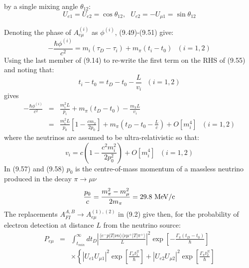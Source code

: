 \documentclass [12pt]{article}
\begin{document}
{  by a single mixing angle $\theta_{12}$:
    \begin{equation}
   U_{e1} = U_{e2} = \cos \theta_{12},~~~ U_{e2} = -U_{\mu 1} = \sin  \theta_{12}
    \end{equation}
  \par Denoting the phase of  $A_{e\mu}^{(i)}$ as $\phi^{(i)}$, (9.49)-(9.51) give:
    \begin{equation}
   -\frac{\hbar \phi^{(i)}}{c^2} =  m_i (\tau_D-\tau_i)+ m_{\pi}(t_i-t_0)~~~(i=1, 2) 
   \end{equation}                         
   Using the last member of (9.14) to re-write the first term on the RHS of (9.55) and noting that:
    \begin{equation}  
    t_i - t_0 = t_D-t_0-\frac{L}{v_i}~~~(i=1, 2)
    \end{equation}
    gives
     \begin{eqnarray}
   -\frac{\hbar \phi^{(i)}}{c^2} & = & \frac{m_i^2 L}{p_i}+ m_{\pi}(t_D-t_0) -\frac{ m_{\pi} L}{v_i}
      \nonumber \\
       & = & \frac{m_i^2 L}{p_0}\left[1-\frac{c m_{\pi}}{2 p_0}\right]+ m_{\pi}(t_D-t_0-\frac{L}{c})
     + O[m_i^4]~~~(i=1, 2) 
   \end{eqnarray}
     where the neutrinos are assumed to be ultra-relativistic so that:
       \begin{equation} 
    v_i = c\left(1-\frac{c^2 m_i^2}{2 p_0^2} \right) + O[m_i^4]~~~(i=1, 2)
    \end{equation}
   In (9.57) and (9.58) $p_0$ is the centre-of-mass momentum of a massless neutrino produced
   in the decay $ \pi \rightarrow \mu \nu$
    \begin{equation}
    \frac{p_0}{c} = \frac{m_{\pi}^2-m_{\mu}^2}{2 m_{\pi}} = 29.8~{\rm MeV/c}
    \end{equation} 
    The replacements $A_{FI}^{A,B} \rightarrow A_{e \mu}^{(1),(2)}$ in (9.2) give then,
    for the probability
   of electron detection at distance $L$ from the neutrino source:
      \begin{eqnarray}
       P_{e \mu} & = & \int_{t_{min}}^{\infty}d t_D \left|\frac{\langle e^-  p |T|\nu n \rangle
        \langle \nu \mu^+ |T|\pi^+ \rangle}{L}\right|^2\exp\left[-\frac{\Gamma_{\pi}(t_D-t_0)}{\hbar}\right]
      \nonumber \\
   &   &  \times \left\{ |U_{e 1} U_{\mu 1}|^2 \exp\left[\frac{\Gamma_{\pi} t_1^{fl}}{\hbar} \right]  
     +  |U_{e 2} U_{\mu 2}|^2 \exp\left[\frac{\Gamma_{\pi} t_2^{fl}}{\hbar}\right] \right. \nonumber \\

\end{eqnarray}}
\end{document}
